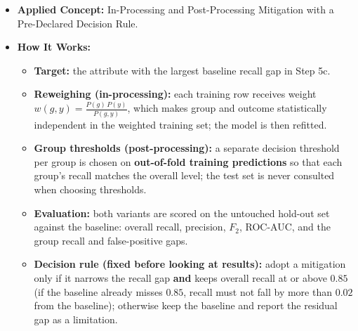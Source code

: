 \documentclass[11pt]{article}
\providecommand{\tightlist}{%
      \setlength{\itemsep}{0pt}\setlength{\parskip}{0pt}}
\begin{document}
\begin{itemize}
\tightlist
\item
  \textbf{Applied Concept:} In-Processing and Post-Processing Mitigation
  with a Pre-Declared Decision Rule.
\item
  \textbf{How It Works:}

  \begin{itemize}
  \tightlist
  \item
    \textbf{Target:} the attribute with the largest baseline recall gap
    in Step 5c.
  \item
    \textbf{Reweighing (in-processing):} each training row receives
    weight \(w(g, y) = \frac{P(g)\,P(y)}{P(g, y)}\), which makes group
    and outcome statistically independent in the weighted training set;
    the model is then refitted.
  \item
    \textbf{Group thresholds (post-processing):} a separate decision
    threshold per group is chosen on \textbf{out-of-fold training
    predictions} so that each group's recall matches the overall level;
    the test set is never consulted when choosing thresholds.
  \item
    \textbf{Evaluation:} both variants are scored on the untouched
    hold-out set against the baseline: overall recall, precision,
    \(F_2\), ROC-AUC, and the group recall and false-positive gaps.
  \item
    \textbf{Decision rule (fixed before looking at results):} adopt a
    mitigation only if it narrows the recall gap \textbf{and} keeps
    overall recall at or above \(0.85\) (if the baseline already misses
    \(0.85\), recall must not fall by more than \(0.02\) from the
    baseline); otherwise keep the baseline and report the residual gap
    as a limitation.
  \end{itemize}
\end{itemize}
\end{document}
